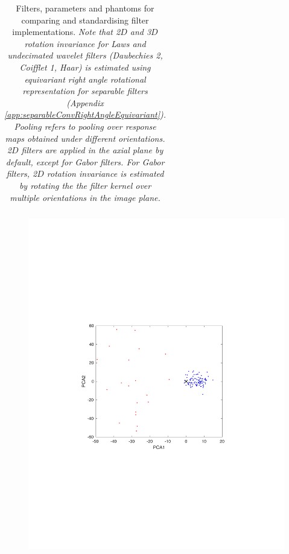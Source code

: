 \documentclass[fleqn,a4paper,oneside,openany]{book}
\begin{document}
\begin{longtable}{cp{3cm}cp{7.7cm}}
    \caption{\normalsize Filters, parameters and phantoms for comparing and standardising filter implementations. \textit{Note that 2\(D\) and 3\(D\) rotation invariance for Laws and undecimated wavelet filters (Daubechies 2, Coifflet 1, Haar) is estimated using equivariant right angle rotational representation for separable filters (Appendix \ref{app:separableConvRightAngleEquivariant}). Pooling refers to pooling over response maps obtained under different orientations. 2\(D\) filters are applied in the axial plane by default, except for Gabor filters. For Gabor filters, 2$D$ rotation invariance is estimated by rotating the the filter kernel over multiple orientations in the image plane.}} \label{tab:benchmark_filter_settings}
\end{longtable}
\normalsize
%
\FloatBarrier
%
\begin{figure}[h!]
\centering
\includegraphics[trim = 0 0 0 0, clip, scale=.7]{PCAconsensus.pdf}
\hspace{0.5cm}

\end{figure}
\end{document}
